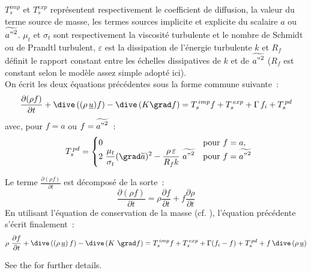 $T_s^{imp}$ et  $T_s^{exp}$ représentent respectivement le coefficient de
diffusion, la valeur du terme source de masse, les termes sources implicite et
explicite du scalaire $a$ ou $\widetilde{{a"}^2}$. $\mu_t$ et $\sigma_t$
sont respectivement la viscosité turbulente et le nombre de Schmidt ou de
Prandtl turbulent, $\varepsilon$ est la dissipation de l'énergie turbulente $k$
et $R_f$ définit le rapport constant entre les échelles dissipatives de $k$ et
de $\widetilde{{a"}^2}$ ($R_f$ est constant selon le modèle assez simple adopté ici).\\
On écrit les deux équations précédentes sous la forme commune suivante~:
\begin{equation}
\frac {\partial  (\rho f)}{\partial t} + \dive\,((\rho\,\underline{u}) f)
- \dive\,(K \grad f) = T_s^{\,imp} f + T_s^{\,exp} + \Gamma\,f_i + T_s^{\,pd}
\end{equation}
avec, pour $f=a$ ou $f=\widetilde{{a"}^2}$~:\\
\begin{equation}
\begin{array}{lll}
&\displaystyle
T_s^{\,pd}=
\begin{cases}
0 & \text{pour $f=a$}, \\
2\ \displaystyle \frac{\mu_t}{\sigma_t}(\grad \widetilde{a})^2 -
\displaystyle \frac{\rho\,\varepsilon}{R_f k}\ \widetilde{{a"}^2} & \text{pour $f=\widetilde{{a"}^2}$ }
\end{cases}
\end{array}
\end{equation}

Le terme $\displaystyle \frac {\partial  (\rho f)}{\partial t}$ est décomposé de la sorte~:
\begin{equation}
\frac {\partial  (\rho f)}{\partial t}=\rho \frac {\partial f}{\partial t} + f
\frac {\partial \rho}{\partial t}
\end{equation}
En utilisant l'équation de conservation de la masse (cf. ),
l'équation précédente s'écrit finalement~:\\
\begin{equation}\label{Base_Covofi_Eq_cv_scal}
\rho\ \displaystyle \frac {\partial f}{\partial t} +
\dive\,((\rho\,\underline{u})\,f) - \dive\,(K\ \grad f)
= T_s^{\,imp} f + T_s^{\,exp} + \Gamma (f_i - f) + T_s^{\,pd} + f\,\dive\,(\rho\,\underline{u})
\end{equation}

See the  for further details.

